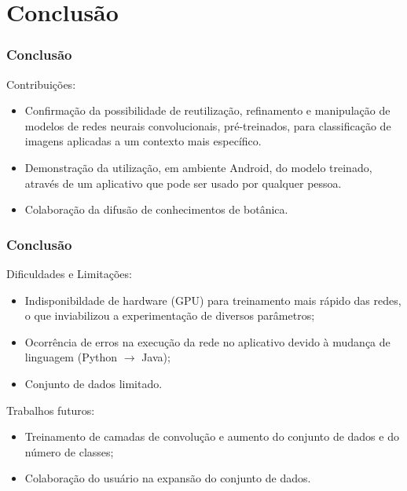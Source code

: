 \documentclass{beamer}
\begin{document}
    \section{Conclusão}
      \begin{frame}[t]
      \frametitle{Conclusão}
      Contribuições:
      \begin{itemize} \medskip
      	\item<1-> Confirmação da possibilidade de reutilização, refinamento e manipulação de modelos de redes neurais convolucionais, pré-treinados, para classificação de imagens aplicadas a um contexto mais específico.
		\item<2-> Demonstração da utilização, em ambiente Android, do modelo treinado, através de um aplicativo que pode ser usado por qualquer pessoa. \medskip
		\item<3-> Colaboração da difusão de conhecimentos de botânica. \medskip
      \end{itemize}       
        
    \end{frame}
    
    \begin{frame}[t]
      \frametitle{Conclusão}
      Dificuldades e Limitações:
      \begin{itemize}
        \item<1-> Indisponibildade de hardware (GPU) para treinamento mais rápido das redes, o que inviabilizou 
        a experimentação de diversos parâmetros;
        \item<2-> Ocorrência de erros na execução da rede no aplicativo devido à mudança de linguagem (Python $\rightarrow${} Java);
	    \item<3-> Conjunto de dados limitado.  
      \end{itemize}
      
      \bigskip    
      {
      	Trabalhos futuros:
     	\begin{itemize}
        	\item<4-> Treinamento de camadas de convolução e aumento do conjunto de dados e do número de classes;
        	\item<5-> Colaboração do usuário na expansão do conjunto de dados.
      	\end{itemize}
      }
      
    \end{frame}
    
        
\end{document}
